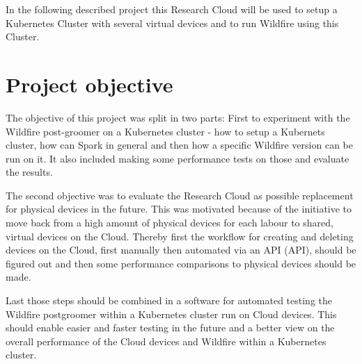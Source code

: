 In the following described project this Research Cloud will be used to setup a Kubernetes Cluster with several virtual devices and to run Wildfire using this Cluster.

\section{Project objective}

The objective of this project was split in two parts: First to experiment with the Wildfire post-groomer on a Kubernetes cluster - how to setup a Kubernets cluster, how can Spark in general and then how a specific Wildfire version can be run on it. It also included making some performance tests on those and evaluate the results. 

The second objective was to evaluate the Research Cloud as possible replacement for physical devices in the future. This was motivated because of the initiative to move back from a high amount of physical devices for each labour to shared, virtual devices on the Cloud. Thereby first the workflow for creating and deleting devices on the Cloud, first manually then automated via an \acs{API} (\acl{API}), should be figured out and then some performance comparisons to physical devices should be made.

Last those steps should be combined in a software for automated testing the Wildfire postgroomer within a Kubernetes cluster run on Cloud devices. This should enable easier and faster testing in the future and a better view on the overall performance of the Cloud devices and Wildfire within a Kubernetes cluster.